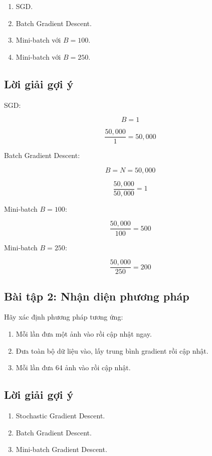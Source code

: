 \begin{enumerate}
    \item SGD.
    \item Batch Gradient Descent.
    \item Mini-batch với $B=100$.
    \item Mini-batch với $B=250$.
\end{enumerate}

\subsection*{Lời giải gợi ý}

SGD:

\[
    B=1
\]

\[
    \frac{50,000}{1}=50,000
\]

Batch Gradient Descent:

\[
    B=N=50,000
\]

\[
    \frac{50,000}{50,000}=1
\]

Mini-batch $B=100$:

\[
    \frac{50,000}{100}=500
\]

Mini-batch $B=250$:

\[
    \frac{50,000}{250}=200
\]

\subsection*{Bài tập 2: Nhận diện phương pháp}

Hãy xác định phương pháp tương ứng:

\begin{enumerate}
    \item Mỗi lần đưa một ảnh vào rồi cập nhật ngay.
    \item Đưa toàn bộ dữ liệu vào, lấy trung bình gradient rồi cập nhật.
    \item Mỗi lần đưa 64 ảnh vào rồi cập nhật.
\end{enumerate}

\subsection*{Lời giải gợi ý}

\begin{enumerate}
    \item Stochastic Gradient Descent.
    \item Batch Gradient Descent.
    \item Mini-batch Gradient Descent.
\end{enumerate}

